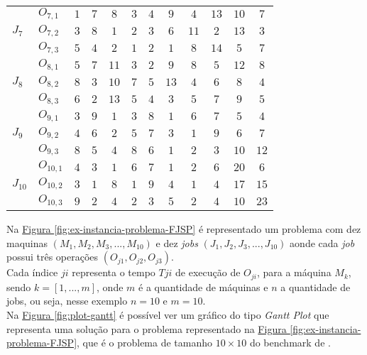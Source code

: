 \begin{table}[htb]
\begin{tabular}[t]{llcccccccccc}
\multirow{3}{*}{$J_7$}&$O_{7,1}$ & $1$ & $7$ & $8$ & $3$ & $4$ & $9$ & $4$ & $13$ & $10$ & $7$\\
&$O_{7,2}$ & $3$ & $8$ & $1$ & $2$ & $3$ & $6$ & $11$ & $2$ & $13$ & $3$\\
&$O_{7,3}$ & $5$ & $4$ & $2$ & $1$ & $2$ & $1$ & $8$ & $14$ & $5$ & $7$\\
\multirow{3}{*}{$J_8$}&$O_{8,1}$ & $5$ & $7$ & $11$ & $3$ & $2$ & $9$ & $8$ & $5$ & $12$ & $8$\\
&$O_{8,2}$ & $8$ & $3$ & $10$ & $7$ & $5$ & $13$ & $4$ & $6$ & $8$ & $4$\\
&$O_{8,3}$ & $6$ & $2$ & $13$ & $5$ & $4$ & $3$ & $5$ & $7$ & $9$ & $5$\\
\multirow{3}{*}{$J_9$}&$O_{9,1}$ & $3$ & $9$ & $1$ & $3$ & $8$ & $1$ & $6$ & $7$ & $5$ & $4$\\
&$O_{9,2}$ & $4$ & $6$ & $2$ & $5$ & $7$ & $3$ & $1$ & $9$ & $6$ & $7$\\
&$O_{9,3}$ & $8$ & $5$ & $4$ & $8$ & $6$ & $1$ & $2$ & $3$ & $10$ & $12$\\
\multirow{3}{*}{$J_{10}$}&$O_{10,1}$ & $4$ & $3$ & $1$ & $6$ & $7$ & $1$ & $2$ & $6$ & $20$ & $6$\\
&$O_{10,2}$ & $3$ & $1$ & $8$ & $1$ & $9$ & $4$ & $1$ & $4$ & $17$ & $15$\\
&$O_{10,3}$ & $9$ & $2$ & $4$ & $2$ & $3$ & $5$ & $2$ & $4$ & $10$ & $23$\\
\hline
    \end{tabular}
\end{table}
            
\noindent Na 
\hyperref[fig:ex-instancia-problema-FJSP]{Figura \ref{fig:ex-instancia-problema-FJSP}}
é representado um problema com dez maquinas $(M_1, M_2, M_3, ..., M_{10})$ e dez \textit{jobs} $(J_1, J_2, J_3, ..., J_{10})$ aonde cada \textit{job} possui três operações $(O_{j1}, O_{j2}, O_{j3})$.\\
%
Cada índice $ji$ representa o tempo $T{ji}$ de execução de $O_{ji}$, para a máquina $M_k$, 
sendo $k=[1, ..., m]$, onde $m$ é a quantidade de máquinas e $n$ a quantidade de jobs, ou seja, nesse exemplo $n=10$ e $m=10$.\\
\indent Na 
\hyperref[fig:plot-gantt]{Figura \ref{fig:plot-gantt}} 
é possível ver um gráfico do tipo \textit{Gantt Plot} que representa uma solução para o problema representado na 
\hyperref[fig:ex-instancia-problema-FJSP]{Figura \ref{fig:ex-instancia-problema-FJSP}}, 
que é o problema de tamanho $10\times10$ do benchmark de  \cite{Kacem2002}.\\

